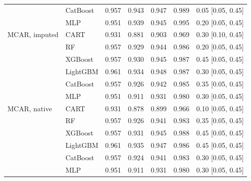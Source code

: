 \documentclass[pdflatex,sn-mathphys]{sn-jnl}
\theoremstyle{thmstyleone}
\begin{document}
\begin{table}[htbp]
\begin{tabular}{@{}llrrrrl@{}}
 & CatBoost & 0.957 & 0.943 & 0.947 & 0.989 & 0.05 [0.05, 0.45] \\
 & MLP & 0.951 & 0.939 & 0.945 & 0.995 & 0.20 [0.05, 0.45] \\
\midrule
MCAR, imputed & CART & 0.931 & 0.881 & 0.903 & 0.969 & 0.30 [0.10, 0.45] \\
 & RF & 0.957 & 0.929 & 0.944 & 0.986 & 0.20 [0.05, 0.45] \\
 & XGBoost & 0.957 & 0.930 & 0.945 & 0.987 & 0.45 [0.05, 0.45] \\
 & LightGBM & 0.961 & 0.934 & 0.948 & 0.987 & 0.30 [0.05, 0.45] \\
 & CatBoost & 0.957 & 0.926 & 0.942 & 0.985 & 0.35 [0.05, 0.45] \\
 & MLP & 0.951 & 0.911 & 0.931 & 0.980 & 0.30 [0.05, 0.45] \\
\midrule
MCAR, native & CART & 0.931 & 0.878 & 0.899 & 0.966 & 0.10 [0.05, 0.45] \\
 & RF & 0.957 & 0.926 & 0.941 & 0.983 & 0.35 [0.05, 0.45] \\
 & XGBoost & 0.957 & 0.931 & 0.945 & 0.988 & 0.45 [0.05, 0.45] \\
 & LightGBM & 0.961 & 0.935 & 0.947 & 0.986 & 0.45 [0.05, 0.45] \\
 & CatBoost & 0.957 & 0.924 & 0.941 & 0.983 & 0.30 [0.05, 0.45] \\
 & MLP & 0.951 & 0.911 & 0.931 & 0.980 & 0.30 [0.05, 0.45] \\
\bottomrule
\end{tabular}
\end{table}
\end{document}
